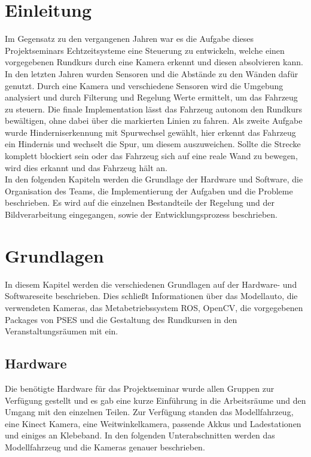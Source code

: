 \section{Einleitung}
\label{cha:einleitung}
Im Gegensatz zu den vergangenen Jahren war es die Aufgabe dieses Projektseminars Echtzeitsysteme eine Steuerung zu entwickeln, welche einen vorgegebenen Rundkurs durch eine Kamera erkennt und diesen absolvieren kann. In den letzten Jahren wurden Sensoren und die Abstände zu den Wänden dafür genutzt. Durch eine Kamera und verschiedene Sensoren wird die Umgebung analysiert und durch Filterung und Regelung Werte ermittelt, um das Fahrzeug zu steuern. 
Die finale Implementation lässt das Fahrzeug autonom den Rundkurs bewältigen, ohne dabei über die markierten Linien zu fahren. Als zweite Aufgabe wurde Hinderniserkennung mit Spurwechsel gewählt, hier erkennt das Fahrzeug ein Hindernis und wechselt die Spur, um diesem auszuweichen. Sollte die Strecke komplett blockiert sein oder das Fahrzeug sich auf eine reale Wand zu bewegen, wird dies erkannt und das Fahrzeug hält an. \\
In den folgenden Kapiteln werden die Grundlage der Hardware und Software, die Organisation des Teams, die Implementierung der Aufgaben und die Probleme beschrieben. Es wird auf die einzelnen Bestandteile der Regelung und der Bildverarbeitung eingegangen, sowie der Entwicklungsprozess beschrieben. 

\clearpage
\section{Grundlagen}
\label{cha:grundlagen}
In diesem Kapitel werden die verschiedenen Grundlagen auf der Hardware- und Softwareseite beschrieben. Dies schließt Informationen über das Modellauto, die verwendeten Kameras, das Metabetriebssystem ROS, OpenCV, die vorgegebenen Packages von PSES und die Gestaltung des Rundkursen in den Veranstaltungsräumen mit ein.

\subsection{Hardware}
\label{sec:hardware}
Die benötigte Hardware für das Projektseminar wurde allen Gruppen zur Verfügung gestellt und es gab eine kurze Einführung in die Arbeitsräume und den Umgang mit den einzelnen Teilen. Zur Verfügung standen das Modellfahrzeug, eine Kinect Kamera, eine Weitwinkelkamera, passende Akkus und Ladestationen und einiges an Klebeband. In den folgenden Unterabschnitten werden das Modellfahrzeug und die Kameras genauer beschrieben. 
